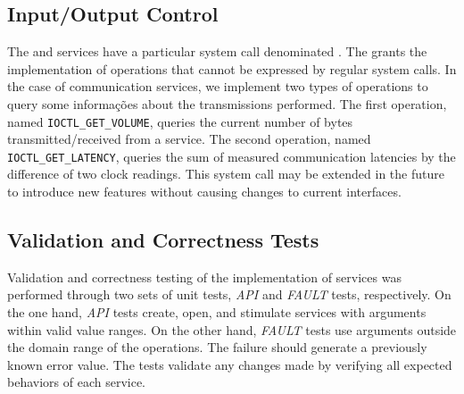 		\subsection{Input/Output Control}


			The \mailbox and \portal services have a particular system call denominated
			\ioctl. The \ioctl grants the implementation of operations that cannot be
			expressed by regular system calls. In the case of communication services,
			we implement two types of operations to query some informações about the
			transmissions performed. The first operation, named \texttt{IOCTL\_GET\_VOLUME},
			queries the current number of bytes transmitted/received from a service.
			The second operation, named \texttt{IOCTL\_GET\_LATENCY}, queries the sum
			of measured communication latencies by the difference of two clock readings.
			This system call may be extended in the future to introduce new features
			without causing changes to current interfaces.

		\subsection{Validation and Correctness Tests}


			Validation and correctness testing of the implementation of services was
			performed through two sets of unit tests, \textit{API} and \textit{FAULT}
			tests, respectively. On the one hand, \textit{API} tests create, open, and
			stimulate services with arguments within valid value ranges. On the other
			hand, \textit{FAULT} tests use arguments outside the domain range of the
			operations. The failure should generate a previously known error value.
			The tests validate any changes made by verifying all expected behaviors
			of each service.
